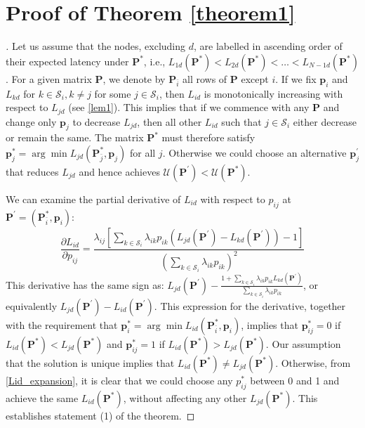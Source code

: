 \documentclass[journal,onecolumn,11pt]{IEEEtran}
\theoremstyle{plain}
\theoremstyle{definition}
\def\bp{{\mathbf p}}
\def\bP{{\mathbf P}}
\def\cU{{\mathcal U}}
\def\cS{{\mathcal S}}
\begin{document}
\section{Proof of Theorem \ref{theorem1}}\label{pt1}
\begin{proof}[\unskip\nopunct]
  Let us assume that the nodes, excluding $d$, are labelled in
  ascending order of their expected latency under $\bP^*$, i.e.,
  $L_{1d}(\bP^*) < L_{2d}(\bP^*) < \dots < L_{N-1d}(\bP^*)$. For a
  given matrix $\bP$, we denote by $\bP_{\bar i}$ all rows of $\bP$
  except $i$. If we fix $\bp_i$ and $L_{kd}$ for $k\in\cS_i, k\neq j$
  for some $j\in \cS_i$, then $L_{id}$ is monotonically increasing
  with respect to $L_{jd}$ (see \eqref{lem1}). This implies that if we
  commence with any $\bP$ and change only $\bp_j$ to decrease
  $L_{jd}$, then all other $L_{id}$ such that $j \in \cS_i$ either
  decrease or remain the same. The matrix $\bP^*$ must therefore
  satisfy $\bp^*_j = \arg \min L_{jd}(\bP^*_{\bar j}, \bp_j)$ for all
  $j$. Otherwise we could choose an alternative $\bp^{\prime}_j$ that
  reduces $L_{jd}$ and hence achieves $\cU(\bP^{\prime})<\cU(\bP^*)$.
  
We can examine the partial derivative of $L_{id}$ with respect to
$p_{ij}$ at $\bP^\prime = (\bP_{\bar i}^*,\bp_i)$:
\begin{equation}
\frac{\partial L_{id}}{\partial p_{ij}}=\frac{\lambda_{ij}[\sum_{k\in \mathcal{S}_i}\lambda_{ik} p_{ik} (L_{jd}(\bP^\prime)-L_{kd}(\bP^\prime))-1]}{(\sum_{k\in \mathcal{S}_i}\lambda_{ik} p_{ik})^2}
\end{equation}
This derivative has the same sign as: $L_{jd}(\bP^\prime) -
\frac{1+\sum_{k\in \mathcal{S}_i}\lambda_{ik} p_{ik}
  L_{kd}(\bP^\prime)}{\sum_{k\in \mathcal{S}_i}\lambda_{ik} p_{ik}}$,
or equivalently $L_{jd}(\bP^\prime)-L_{id}(\bP^\prime)$.  This
expression for the derivative, together with the requirement that
$\bp^*_i = \arg \min L_{id}(\bP^*_{\bar i}, \bp_i)$, implies that
$\bp^*_{ij} = 0$ if $L_{id}(\bP^*)<L_{jd}(\bP^*)$ and $\bp^*_{ij} = 1$
if $L_{id}(\bP^*)>L_{jd}(\bP^*)$. Our assumption that the solution is
unique implies that $L_{id}(\bP^*)\neq L_{jd}(\bP^*)$. Otherwise, from
\eqref{Lid_expansion}, it is clear that we could choose any $p^*_{ij}$
between 0 and 1 and achieve the same $L_{id}(\bP^*)$, without
affecting any other $L_{jd}(\bP^*)$. This establishes
statement (1) of the theorem.


\end{proof}
\end{document}
